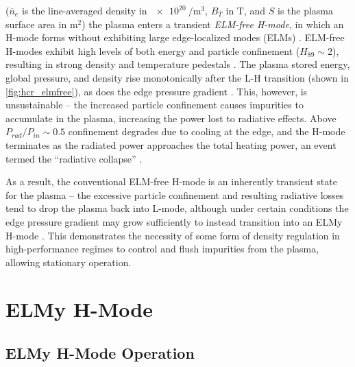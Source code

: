 \noindent ($\overline{n}_e$ is the line-averaged density in $\SI{e20}{\per\meter\cubed}$, $B_T$ in $\si{\tesla}$, and $S$ is the plasma surface area in $\si{\meter\squared}$) the plasma enters a transient \emph{ELM-free H-mode}, in which an H-mode forms without exhibiting large edge-localized modes (ELMs) \cite{Zohm1996,Suttrop2000a}.  ELM-free H-modes exhibit high levels of both energy and particle confinement ($H_{89} \sim 2$), resulting in strong density and temperature pedestals \cite{Hubbard2000,Hatae1998}.  The plasma stored energy, global pressure, and density rise monotonically after the L-H transition (shown in \cref{fig:hcr_elmfree}), as does the edge pressure gradient \cite{Breger1998}.  This, however, is unsustainable -- the increased particle confinement causes impurities to accumulate in the plasma, increasing the power lost to radiative effects.  Above $P_{rad}/P_{in} \sim 0.5$ confinement degrades due to cooling at the edge, and the H-mode terminates as the radiated power approaches the total 
heating power, an event termed the ``radiative collapse'' \cite{Greenwald1997}.

As a result, the conventional ELM-free H-mode is an inherently transient state for the plasma -- the excessive particle confinement and resulting radiative losses tend to drop the plasma back into L-mode, although under certain conditions the edge pressure gradient may grow sufficiently to instead transition into an ELMy H-mode \cite{Breger1998}.  This demonstrates the necessity of some form of density regulation in high-performance regimes to control and flush impurities from the plasma, allowing stationary operation.\nicesectionending

\section{ELMy H-Mode}\label{sec:hcr_elmy}

\subsection{ELMy H-Mode Operation}\label{subsec:hcr_elmy_ped}

